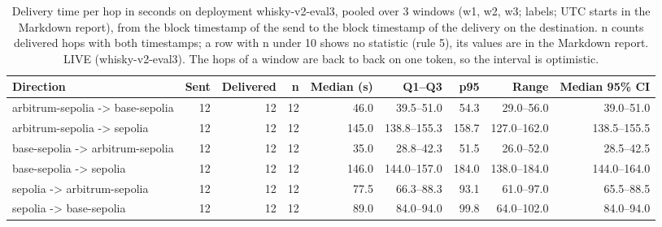 \begin{table}[htbp]
    \centering
    \small
    \begin{tabular}{lrrrrrrrr}
    \toprule
    Direction & Sent & Delivered & n & Median (s) & Q1--Q3 & p95 & Range & Median 95\% CI \\
    \midrule
    arbitrum-sepolia -> base-sepolia & 12 & 12 & 12 & 46.0 & 39.5--51.0 & 54.3 & 29.0--56.0 & 39.0--51.0 \\
    arbitrum-sepolia -> sepolia & 12 & 12 & 12 & 145.0 & 138.8--155.3 & 158.7 & 127.0--162.0 & 138.5--155.5 \\
    base-sepolia -> arbitrum-sepolia & 12 & 12 & 12 & 35.0 & 28.8--42.3 & 51.5 & 26.0--52.0 & 28.5--42.5 \\
    base-sepolia -> sepolia & 12 & 12 & 12 & 146.0 & 144.0--157.0 & 184.0 & 138.0--184.0 & 144.0--164.0 \\
    sepolia -> arbitrum-sepolia & 12 & 12 & 12 & 77.5 & 66.3--88.3 & 93.1 & 61.0--97.0 & 65.5--88.5 \\
    sepolia -> base-sepolia & 12 & 12 & 12 & 89.0 & 84.0--94.0 & 99.8 & 64.0--102.0 & 84.0--94.0 \\
    \bottomrule
    \end{tabular}
    \caption{Delivery time per hop in seconds on deployment whisky-v2-eval3, pooled over 3 windows (w1, w2, w3; labels; UTC starts in the Markdown report), from the block timestamp of the send to the block timestamp of the delivery on the destination. n counts delivered hops with both timestamps; a row with n under 10 shows no statistic (rule 5), its values are in the Markdown report. LIVE (whisky-v2-eval3). The hops of a window are back to back on one token, so the interval is optimistic.}
    \label{tab:delivery-latency-pooled}
\end{table}
